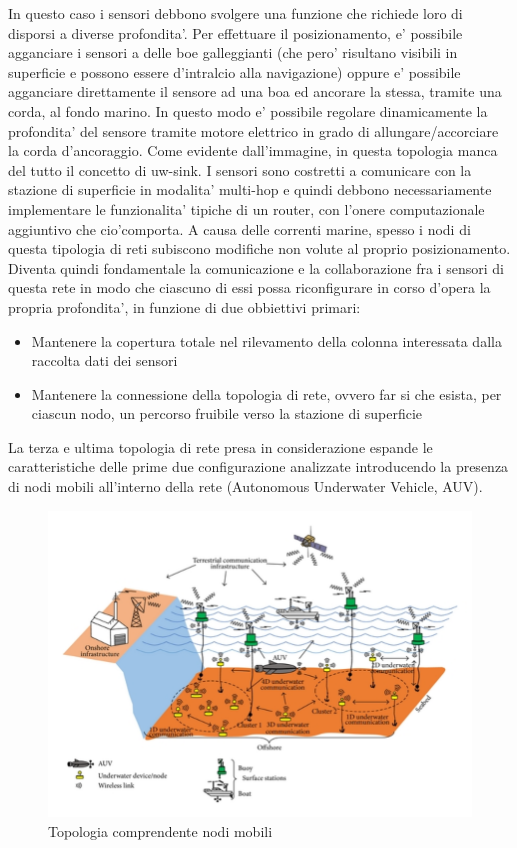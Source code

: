 \documentclass[Lau,binding=0.6cm]{sapthesis}
\begin{document}
In questo caso i sensori debbono svolgere una funzione che richiede loro di disporsi a diverse profondita'. Per effettuare il posizionamento, e' possibile agganciare i sensori a delle boe galleggianti (che pero' risultano visibili in superficie e possono essere d'intralcio alla navigazione) oppure e' possibile agganciare direttamente il sensore ad una boa ed ancorare la stessa, tramite una corda, al fondo marino.  In questo modo e' possibile regolare dinamicamente la profondita' del sensore tramite motore elettrico in grado di allungare/accorciare la corda d'ancoraggio. Come evidente dall'immagine, in questa topologia manca del tutto il concetto di uw-sink. I sensori sono costretti a comunicare con la stazione di superficie in modalita' multi-hop e quindi debbono necessariamente implementare le funzionalita' tipiche di un router, con l'onere computazionale aggiuntivo che cio'comporta. A causa delle correnti marine, spesso i nodi di questa tipologia di reti subiscono modifiche non volute al proprio posizionamento. Diventa quindi fondamentale la comunicazione e la collaborazione fra i sensori di questa rete in modo che ciascuno di essi possa riconfigurare in corso d'opera la propria profondita', in funzione di due obbiettivi primari:
\begin{itemize}

 \item Mantenere la copertura totale nel rilevamento della colonna interessata dalla raccolta dati dei sensori

\item Mantenere la connessione della topologia di rete, ovvero far si che esista, per ciascun nodo, un percorso fruibile verso la stazione di superficie
\end{itemize}

La terza e ultima topologia di rete presa in considerazione espande le caratteristiche delle prime due configurazione analizzate introducendo la presenza di nodi mobili all'interno della rete (Autonomous Underwater Vehicle, AUV).

\begin{figure}[h]
	\includegraphics[width=\linewidth]{auv_arch.png}
	\caption{ Topologia comprendente nodi mobili}
	\label{fig:}
\end{figure}
\end{document}
